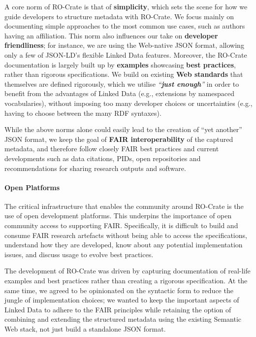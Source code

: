 A core norm of RO-Crate is that of \textbf{simplicity}, which sets the
scene for how we guide developers to structure metadata with RO-Crate.
We focus mainly on documenting simple approaches to the most common use
cases, such as authors having an affiliation. This norm also influences
our take on \textbf{developer friendliness}; for instance, we are using
the Web-native JSON format, allowing only a few of JSON-LD's flexible
Linked Data features. Moreover, the RO-Crate documentation is largely
built up by \textbf{examples} showcasing \textbf{best practices}, rather
than rigorous specifications. We build on existing \textbf{Web
standards} that themselves are defined rigorously, which we utilise
\emph{``\textbf{just enough}''} in order to benefit from the advantages
of Linked Data (e.g., extensions by namespaced vocabularies), without
imposing too many developer choices or uncertainties (e.g., having to
choose between the many RDF syntaxes).

While the above norms alone could easily lead to the creation of ``yet
another'' JSON format, we keep the goal of \textbf{FAIR
interoperability} of the captured metadata, and therefore follow closely
FAIR best practices and current developments such as data citations,
PIDs, open repositories and recommendations for sharing research outputs
and software.

\paragraph{Open Platforms}\label{ch5:open-platforms}

The critical infrastructure that enables the community around RO-Crate
is the use of open development platforms. This underpins the importance
of open community access to supporting FAIR. Specifically, it is
difficult to build and consume FAIR research artefacts without being
able to access the specifications, understand how they are developed,
know about any potential implementation issues, and discuss usage to
evolve best practices.

The development of RO-Crate was driven by capturing documentation of
real-life examples and best practices rather than creating a rigorous
specification. At the same time, we agreed to be opinionated on the
syntactic form to reduce the jungle of implementation choices; we wanted
to keep the important aspects of Linked Data to adhere to the FAIR
principles while retaining the option of combining and extending the
structured metadata using the existing Semantic Web stack, not just
build a standalone JSON format.

